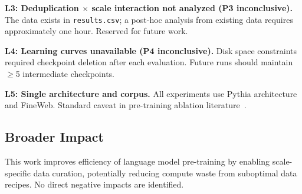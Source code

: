 \textbf{L3: Deduplication $\times$ scale interaction not analyzed (P3 inconclusive).}
The data exists in \texttt{results.csv}; a post-hoc analysis from existing data requires approximately one hour. Reserved for future work.

\textbf{L4: Learning curves unavailable (P4 inconclusive).}
Disk space constraints required checkpoint deletion after each evaluation. Future runs should maintain $\geq$5 intermediate checkpoints.

\textbf{L5: Single architecture and corpus.}
All experiments use Pythia architecture and FineWeb. Standard caveat in pre-training ablation literature~\cite{Zhou2024ProX,Wettig2025Organize}.

\subsection{Broader Impact}

This work improves efficiency of language model pre-training by enabling scale-specific data curation, potentially reducing compute waste from suboptimal data recipes. No direct negative impacts are identified.
